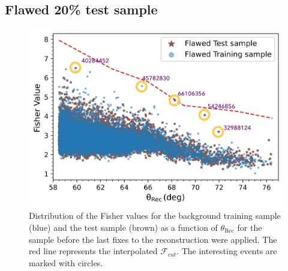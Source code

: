 \subsection{Flawed 20\% test sample}
\label{subsec:unblind_20}

\begin{figure}[t!]
  \centering
  \includegraphics[width=14.5cm]{thesis_figures/Nu_analysis/Fisher_plots/Fisher_comp_bkg_test_flawed_wnt.pdf}
  \caption{Distribution of the Fisher values for the background training sample (blue) and the test sample (brown) as a function of $\theta_{\text{Rec}}$ for the sample before the last fixes to the reconstruction were applied. The red line represents the interpolated $\mathcal{F}_{cut}$. The interesting events are marked with circles.}
  \label{fig:Fish_bkg_test_flawed}
\end{figure}

